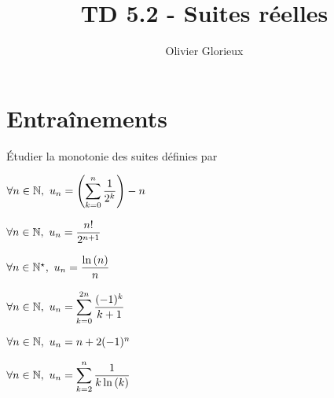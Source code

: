 \documentclass[a4paper, 11pt]{article}
\author{Olivier Glorieux}
\newcommand{\type}{TD }
\begin{document}
\title{\type  5.2 - Suites réelles}

\section*{Entraînements}
\begin{exercice} \; \'Etudier la monotonie des suites d\'efinies par
\begin{enumerate}
\begin{minipage}[t]{0.4\textwidth}
\item
$\forall n\in\mathbb{N},\ u_n=\left(\displaystyle \sum\limits_{k=0}^n \displaystyle\frac{1}{2^k}\right)-n$ 
\item 
$\forall n\in\N,\ u_n=\ddp\frac{n!}{2^{n+1}}$ 
\item 
$\forall n\in\N^{\star},\ u_n=\ddp\frac{\ln{(n)}}{n}$ 
\end{minipage}
\begin{minipage}[t]{0.4\textwidth}
\item 
$\forall n\in\mathbb{N},\ u_n=\displaystyle \sum\limits_{k=0}^{2n}\displaystyle\frac{(-1)^k}{k+1}$ 
\item 
$\forall n\in\mathbb{N},\ u_n=n+2(-1)^n$ 
\item $\forall n\in\mathbb{N},\ u_n=\displaystyle \sum\limits_{k=2}^{n}\displaystyle\frac{1}{k\ln{(k)}}$ 
\end{minipage}
\end{enumerate}
\end{exercice}
\end{document}

